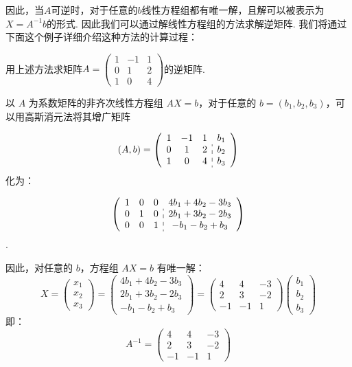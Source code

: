 因此，当$A$可逆时，对于任意的$b$线性方程组都有唯一解，且解可以被表示为$X=A^{-1}b$的形式. 因此我们可以通过解线性方程组的方法求解逆矩阵. 我们将通过下面这个例子详细介绍这种方法的计算过程：
\begin{example}{}{}
    用上述方法求矩阵$A=\begin{pmatrix}1 & -1 & 1 \\ 0 & 1 & 2 \\ 1 & 0 & 4\end{pmatrix}$的逆矩阵.
\end{example}

\begin{solution}
    以 $A$ 为系数矩阵的非齐次线性方程组 $AX=b$，对于任意的 $b=(b_1,b_2,b_3)$，可以用高斯消元法将其增广矩阵

    \[(A,b)=\left(\begin{array}{ccc:c}
                1 & -1 & 1 & b_1 \\
                0 & 1  & 2 & b_2 \\
                1 & 0  & 4 & b_3
            \end{array}\right)\] 化为：

    \[\left(\begin{array}{ccc:c}
                1 & 0 & 0 & 4b_1+4b_2-3b_3 \\
                0 & 1 & 0 & 2b_1+3b_2-2b_3 \\
                0 & 0 & 1 & -b_1-b_2+b_3
            \end{array}\right)\].

    因此，对任意的 $b$，方程组 $AX=b$ 有唯一解：
    \[X=\begin{pmatrix}x_1\\x_2\\x_3\end{pmatrix}=\begin{pmatrix}
            4b_1+4b_2-3b_3 \\2b_1+3b_2-2b_3\\-b_1-b_2+b_3
        \end{pmatrix}=\begin{pmatrix}
            4  & 4  & -3 \\
            2  & 3  & -2 \\
            -1 & -1 & 1
        \end{pmatrix}\begin{pmatrix}b_1\\b_2\\b_3\end{pmatrix}\] 即：
    \[A^{-1}=\begin{pmatrix}
            4  & 4  & -3 \\
            2  & 3  & -2 \\
            -1 & -1 & 1
        \end{pmatrix}\]
\end{solution}

